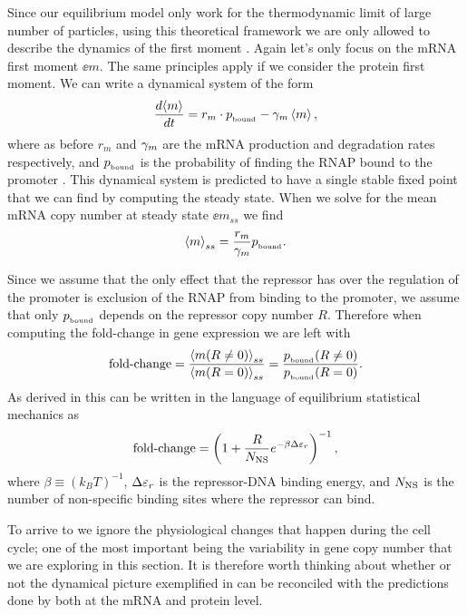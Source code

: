 Since our equilibrium model only work for the thermodynamic limit of large
number of particles, using this theoretical framework we are only allowed to
describe the dynamics of the first moment \cite{Phillips2015}.
Again let's only focus on the mRNA first moment $\ee{m}$. The same principles
apply if we consider the protein first moment. We can write a dynamical system
of the form
\begin{equation}
  {d{\left\langle m \right\rangle} \over dt} = r_m \cdot p_{_\text{bound}} - \gamma _m \left\langle m \right\rangle,
\end{equation}
where as before $r_m$ and $\gamma _m$ are the mRNA production and degradation rates
respectively, and $p_{_\text{bound}}$ is the probability of finding the RNAP bound to the
promoter \cite{Bintu2005a}. This dynamical system is predicted to have a single
stable fixed point that we can find by computing the steady state. When we solve
for the mean mRNA copy number at steady state $\ee{m}_{ss}$ we find
\begin{equation}
  \left\langle m \right\rangle_{ss} = {r_m \over \gamma _m} p_{_\text{bound}}.
\end{equation}

Since we assume that the only effect that the repressor has over the regulation
of the promoter is exclusion of the RNAP from binding to the promoter, we assume
that only $p_{_\text{bound}}$ depends on the repressor copy number $R$. Therefore when
computing the fold-change in gene expression we  are left with
\begin{equation}
  \text{fold-change} = {\left\langle m (R \neq 0) \right\rangle_{ss} \over \left\langle m (R = 0) \right\rangle_{ss}}
              = {p_{_\text{bound}} (R \neq 0) \over p_{_\text{bound}} (R = 0)}.
\end{equation}
As derived in \cite{Garcia2011c} this can be written in the language of
equilibrium statistical mechanics as
\begin{equation}
  \text{fold-change} = \left(1 + {R \over N_\text{NS}}e^{-\beta \Delta\varepsilon_r}  \right)^{-1},
  \label{seq_fold_change_thermo}
\end{equation}
where $\beta \equiv (k_BT)^{-1}$, $\Delta\varepsilon_r$ is the repressor-DNA binding energy, and
$N_\text{NS}$ is the number of non-specific binding sites where the repressor can bind.

To arrive to  we ignore the physiological changes
that happen during the cell cycle; one of the most important being the
variability in gene copy number that we are exploring in this section. It is
therefore worth thinking about whether or not the dynamical picture exemplified
in  can be reconciled with the predictions done by
 both at the mRNA and protein level.

